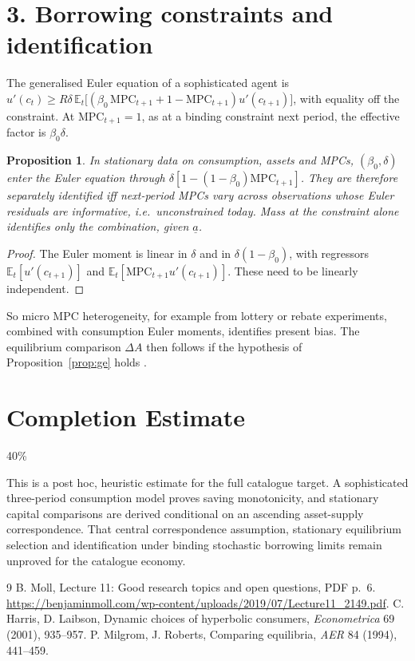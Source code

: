\documentclass[11pt]{article}
\newtheorem{proposition}[theorem]{Proposition}
\theoremstyle{definition}
\begin{document}
\section*{3. Borrowing constraints and identification}
The generalised Euler equation of a sophisticated agent \cite{hl} is
$u'(c_t)\ge R\delta\,\mathbb E_t\bigl[(\beta_0\,\mathrm{MPC}_{t+1}+1-\mathrm{MPC}_{t+1})u'(c_{t+1})\bigr]$, with
equality off the constraint. At $\mathrm{MPC}_{t+1}=1$, as at a binding constraint next period, the effective factor is
$\beta_0\delta$.
\begin{proposition}\label{prop:id}
In stationary data on consumption, assets and MPCs, $(\beta_0,\delta)$ enter the Euler equation through
$\delta[1-(1-\beta_0)\mathrm{MPC}_{t+1}]$. They are therefore separately identified iff next-period MPCs vary across
observations whose Euler residuals are informative, i.e.\ unconstrained today. Mass at the constraint alone identifies only
the combination, given $\underline a$.
\end{proposition}
\begin{proof}
The Euler moment is linear in $\delta$ and in $\delta(1-\beta_0)$, with regressors $\mathbb E_t[u'(c_{t+1})]$ and
$\mathbb E_t[\mathrm{MPC}_{t+1}u'(c_{t+1})]$. These need to be linearly independent.
\end{proof}
So micro MPC heterogeneity, for example from lottery or rebate experiments, combined with consumption Euler moments,
identifies present bias. The equilibrium comparison $\Delta A$ then follows if the hypothesis of Proposition~\ref{prop:ge} holds
\cite{moll}.

\section{Completion Estimate}
40\%

This is a post hoc, heuristic estimate for the full catalogue target.
A sophisticated three-period consumption model proves saving monotonicity, and stationary capital comparisons are derived conditional on an ascending asset-supply correspondence. That central correspondence assumption, stationary equilibrium selection and identification under binding stochastic borrowing limits remain unproved for the catalogue economy.

\begin{thebibliography}{9}
 B. Moll, Lecture 11: Good research topics and open questions, PDF p.~6. \url{https://benjaminmoll.com/wp-content/uploads/2019/07/Lecture11_2149.pdf}.
 C. Harris, D. Laibson, Dynamic choices of hyperbolic consumers, \emph{Econometrica} 69 (2001), 935--957.
 P. Milgrom, J. Roberts, Comparing equilibria, \emph{AER} 84 (1994), 441--459.
\end{thebibliography}
\end{document}
